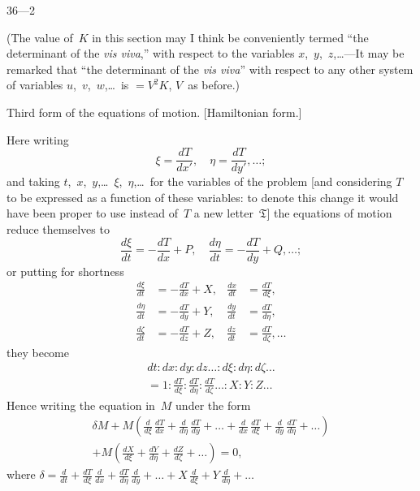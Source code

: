 \documentclass[11pt,a4paper]{book}
\begin{document}
\begin{center}
36---2
\end{center}

\newpage
(The value of~$K$ in this section may I think be conveniently termed ``the determinant of the \textit{vis viva},'' with respect to the variables $x$,~$y$,~$z$,\ldots---It may be remarked that ``the determinant of the \textit{vis viva}'' with respect to any other system of variables $u$,~$v$,~$w$,\ldots\ is $=V^2 K$, $V$~as before.)

\vspace{10pt}

 Third form of the equations of motion. [Hamiltonian form.]

Here writing
\[
\xi = \frac{dT}{dx'}, \quad \eta = \frac{dT}{dy'}, \ldots;
\]
and taking $t$,~$x$,~$y$,\ldots\ $\xi$,~$\eta$,\ldots\ for the variables of the problem [and considering $T$ to be expressed as a function of these variables: to denote this change it would have been proper to use instead of~$T$ a new letter~$\mathfrak{T}$] the equations of motion reduce themselves to
\[
\frac{d\xi}{dt} = -\frac{dT}{dx} + P, \quad \frac{d\eta}{dt} = -\frac{dT}{dy} + Q, \ldots;
\]
or putting for shortness
\begin{align*}
\frac{d\xi}{dt} &= -\frac{dT}{dx} + X, &
\frac{dx}{dt} &= \frac{dT}{d\xi},\\
\frac{d\eta}{dt} &= -\frac{dT}{dy} + Y, &
\frac{dy}{dt} &= \frac{dT}{d\eta},\\
\frac{d\zeta}{dt} &= -\frac{dT}{dz} + Z, &
\frac{dz}{dt} &= \frac{dT}{d\zeta},\ldots
\end{align*}
they become
\begin{multline*}
dt : dx : dy : dz\ldots : d\xi : d\eta : d\zeta\ldots \\
= 1 : \frac{dT}{d\xi} : \frac{dT}{d\eta} : \frac{dT}{d\zeta}\ldots : X : Y : Z\ldots
\end{multline*}
Hence writing the equation in~$M$ under the form
\begin{multline*}
\delta M + M\left(\frac{d}{d\xi}\,\frac{dT}{dx} + \frac{d}{d\eta}\,\frac{dT}{dy} + \ldots + \frac{d}{dx}\,\frac{dT}{d\xi} + \frac{d}{dy}\,\frac{dT}{d\eta} + \ldots\right) \\
+ M\left(\frac{dX}{d\xi} + \frac{dY}{d\eta} + \frac{dZ}{d\zeta} + \ldots\right) = 0,
\end{multline*}
where $\delta = \frac{d}{dt} + \frac{dT}{d\xi}\,\frac{d}{dx} + \frac{dT}{d\eta}\,\frac{d}{dy} + \ldots + X\,\frac{d}{d\xi} + Y\,\frac{d}{d\eta} + \ldots$
\end{document}
